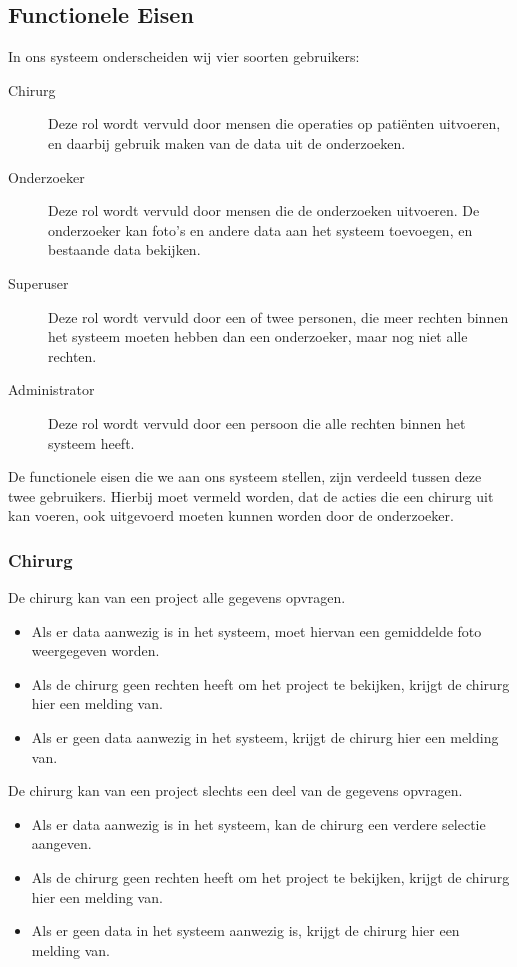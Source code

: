 \subsection{Functionele Eisen}
\label{functionele_eisen}
In ons systeem onderscheiden wij vier soorten gebruikers:
\begin{description}
	\item[Chirurg] Deze rol wordt vervuld door mensen die operaties op pati\"enten uitvoeren, en daarbij gebruik maken van de data uit de onderzoeken.
	\item[Onderzoeker] Deze rol wordt vervuld door mensen die de onderzoeken uitvoeren. De onderzoeker kan foto's en andere data aan het systeem toevoegen, en bestaande data bekijken.	
	\item[Superuser] Deze rol wordt vervuld door een of twee personen, die meer rechten binnen het systeem moeten hebben dan een onderzoeker, maar nog niet alle rechten.
	\item[Administrator] Deze rol wordt vervuld door een persoon die alle rechten binnen het systeem heeft.
\end{description}
De functionele eisen die we aan ons systeem stellen, zijn verdeeld tussen deze twee gebruikers. Hierbij moet vermeld worden, dat de acties die een chirurg uit kan voeren, ook uitgevoerd moeten kunnen worden door de onderzoeker.
\subsubsection{Chirurg}

De chirurg kan van een project alle gegevens opvragen.
\begin{itemize}
	\item Als er data aanwezig is in het systeem, moet hiervan een gemiddelde foto weergegeven worden. 
	\item Als de chirurg geen rechten heeft om het project te bekijken, krijgt de chirurg hier een melding van.
	\item Als er geen data aanwezig in het systeem, krijgt de chirurg hier een melding van. 
\end{itemize}

De chirurg kan van een project slechts een deel van de gegevens opvragen.
\begin{itemize}
	\item Als er data aanwezig is in het systeem, kan de chirurg een verdere selectie aangeven.
	\item Als de chirurg geen rechten heeft om het project te bekijken, krijgt de chirurg hier een melding van.
	\item Als er geen data in het systeem aanwezig is, krijgt de chirurg hier een melding van.
\end{itemize}

